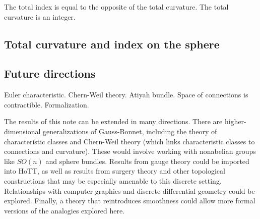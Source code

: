 \begin{mycor}
The total index is equal to the opposite of the total curvature. The total curvature is an integer.
\end{mycor}

\subsection{Total curvature and index on the sphere}

\subsection{Future directions}
Euler characteristic. Chern-Weil theory. Atiyah bundle. Space of connections is contractible. Formalization.

The results of this note can be extended in many directions. There are higher-dimensional generalizations of Gauss-Bonnet, including the theory of characteristic classes and Chern-Weil theory (which links characteristic classes to connections and curvature). These would involve working with nonabelian groups like \( SO(n) \) and sphere bundles. Results from gauge theory could be imported into HoTT, as well as results from surgery theory and other topological constructions that may be especially amenable to this discrete setting. Relationships with computer graphics and discrete differential geometry\cite{crane_ddg}\cite{crane_connections} could be explored. Finally, a theory that reintroduces smoothness could allow more formal versions of the analogies explored here. 
